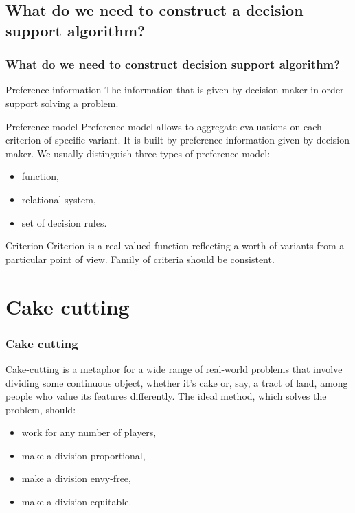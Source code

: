 \documentclass{beamer}
\begin{document}
\subsection{What do we need to construct a decision support algorithm?}
\begin{frame}
\frametitle{What do we need to construct decision support algorithm?}
\begin{block}{Preference information}
The information that is given by decision maker in order support solving a problem.
\end{block}
\begin{block}{Preference model}
Preference model allows to aggregate evaluations on each criterion of specific variant.
It is built by preference information given by decision maker. We usually distinguish three types of preference model:
\begin{itemize}
\item function,
\item relational system,
\item set of decision rules.
\end{itemize}
\end{block}
\begin{block}{Criterion}
Criterion is a real-valued function reflecting a worth of variants from a particular point of view. Family of criteria should be consistent.
\end{block}
\end{frame}


\section{Cake cutting}
\begin{frame}
\frametitle{Cake cutting}
Cake-cutting is a metaphor for a wide range of real-world problems that involve dividing some continuous object, whether it’s cake or, say, a tract of land, among people who value its features differently. 
The ideal method, which solves the problem, should:
\begin{itemize}
\item work for any number of players,
\item make a division proportional,
\item make a division envy-free, 
\item make a division equitable. 
\end{itemize}

\end{frame}
\end{document}
